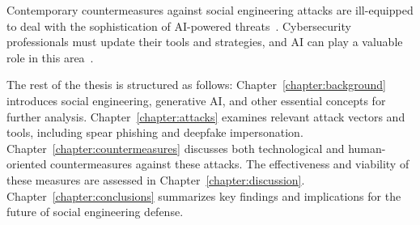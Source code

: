 %
%
Contemporary countermeasures against social engineering attacks are ill-equipped to deal with the sophistication of AI-powered threats~\citep{blauth_AI_Crime_Overview_Malicious_Use_Abuse_2022, king_AI_Crime_Interdisciplinary_Analysis_2019}. Cybersecurity professionals must update their tools and strategies, and AI can play a valuable role in this area~\citep{fakhouri_AI_Driven_Solutions_SE_Attacks_2024, tsinganos_Towards_Automated_Recognition_Chat_SE_Enterprise_2018}.





%
%
The rest of the thesis is structured as follows: Chapter~\ref{chapter:background} introduces social engineering, generative AI, and other essential concepts for further analysis. Chapter~\ref{chapter:attacks} examines relevant attack vectors and tools, including spear phishing and deepfake impersonation. Chapter~\ref{chapter:countermeasures} discusses both technological and human-oriented countermeasures against these attacks. The effectiveness and viability of these measures are assessed in Chapter~\ref{chapter:discussion}. Chapter~\ref{chapter:conclusions} summarizes key findings and implications for the future of social engineering defense.






